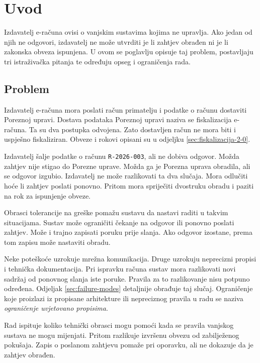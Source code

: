 \section{Uvod}
\label{ch:uvod}

Izdavatelj e-računa ovisi o vanjskim sustavima kojima ne upravlja. Ako jedan od
njih ne odgovori, izdavatelj ne može utvrditi je li zahtjev obrađen ni je li
zakonska obveza ispunjena. U ovom se poglavlju opisuje taj problem, postavljaju
tri istraživačka pitanja te određuju opseg i ograničenja rada.

\subsection{Problem}
\label{sec:problem}

Izdavatelj e-računa mora poslati račun primatelju i podatke o računu dostaviti
Poreznoj upravi. Dostava podataka Poreznoj upravi naziva se fiskalizacija
e-računa. Ta su dva postupka odvojena. Zato dostavljen račun ne mora biti i
uspješno fiskaliziran.
Obveze i rokovi opisani su u odjeljku \ref{sec:fiskalizacija-2-0}.

Izdavatelj šalje podatke o računu \texttt{R-2026-003}, ali ne dobiva odgovor.
Možda zahtjev nije stigao do Porezne uprave. Možda ga je Porezna uprava
obradila, ali se odgovor izgubio. Izdavatelj ne može razlikovati ta dva
slučaja. Mora odlučiti hoće li zahtjev poslati ponovno. Pritom mora spriječiti
dvostruku obradu i paziti na rok za ispunjenje obveze.

Obrasci tolerancije na greške pomažu sustavu da nastavi raditi u takvim
situacijama. Sustav može ograničiti čekanje na odgovor ili ponovno poslati
zahtjev. Može i trajno zapisati poruku prije slanja. Ako odgovor izostane,
prema tom zapisu može nastaviti obradu.

Neke poteškoće uzrokuje mrežna komunikacija. Druge uzrokuju neprecizni
propisi i tehnička dokumentacija. Pri ispravku računa sustav mora razlikovati
novi sadržaj od ponovnog slanja iste poruke. Pravila za to razlikovanje nisu
potpuno određena. Odjeljak \ref{sec:failure-modes} detaljnije obrađuje taj
slučaj. Ograničenje koje proizlazi iz propisane arhitekture ili nepreciznog
pravila u radu se naziva \emph{ograničenje uvjetovano propisima}.

Rad ispituje koliko tehnički obrasci mogu pomoći kada se pravila vanjskog
sustava ne mogu mijenjati. Pritom razlikuje izvršenu obvezu od zabilježenog
pokušaja. Zapis o poslanom zahtjevu pomaže pri oporavku, ali ne dokazuje da
je zahtjev obrađen.

